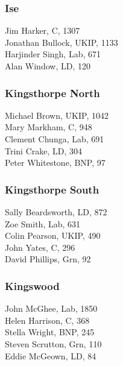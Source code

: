 \documentclass[a4paper,openany,10pt]{book}
\begin{document}
\subsubsection*{Ise}



Jim Harker, C, 1307\\
Jonathan Bullock, UKIP, 1133\\
Harjinder Singh, Lab, 671\\
Alan Window, LD, 120\\


\subsubsection*{Kingsthorpe North}



Michael Brown, UKIP, 1042\\
Mary Markham, C, 948\\
Clement Chunga, Lab, 691\\
Trini Crake, LD, 304\\
Peter Whitestone, BNP, 97\\


\subsubsection*{Kingsthorpe South}



Sally Beardsworth, LD, 872\\
Zoe Smith, Lab, 631\\
Colin Pearson, UKIP, 490\\
John Yates, C, 296\\
David Phillips, Grn, 92\\


\subsubsection*{Kingswood}



John McGhee, Lab, 1850\\
Helen Harrison, C, 368\\
Stella Wright, BNP, 245\\
Steven Scrutton, Grn, 110\\
Eddie McGeown, LD, 84\\
\end{document}
